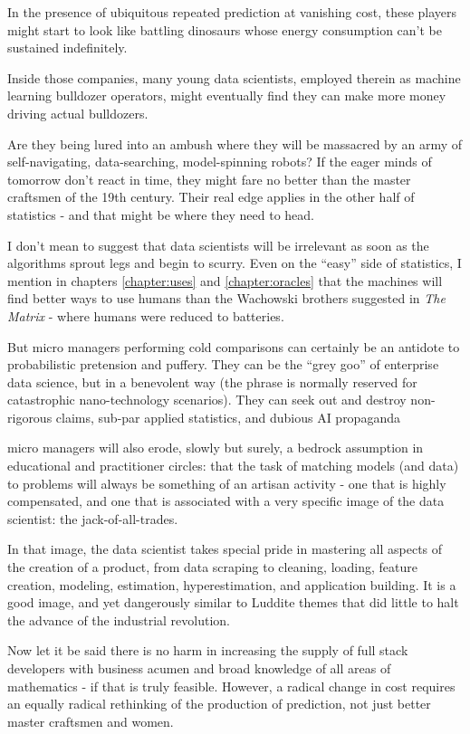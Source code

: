 In the presence of ubiquitous repeated prediction at vanishing cost, these players might start to look like battling dinosaurs whose energy consumption can't be sustained indefinitely.  

Inside those companies, many young data scientists, employed therein as machine learning bulldozer operators, might eventually find they can make more money driving actual bulldozers.   


Are they being lured into an ambush where they will be massacred by an army of self-navigating, data-searching, model-spinning robots? If the eager minds of tomorrow don't react in time, they might fare no better than the master craftsmen of the 19th century. Their real edge applies in the other half of statistics - and that might be where they need to head. 


I don't mean to suggest that data scientists will be irrelevant as soon as the algorithms sprout legs and begin to scurry. Even on the ``easy'' side of statistics, I mention in chapters \ref{chapter:uses} and \ref{chapter:oracles} that the machines will find better ways to use humans than the Wachowski brothers suggested in {\em The Matrix} - where humans were reduced to batteries. 


But micro managers performing cold comparisons can certainly be an antidote to probabilistic pretension and puffery. They can be the ``grey goo'' of enterprise data science, but in a benevolent way  (the phrase is normally reserved for catastrophic nano-technology scenarios). They can seek out and destroy non-rigorous claims, sub-par applied statistics, and dubious AI propaganda


micro managers will also erode, slowly but surely, a bedrock assumption in educational and practitioner circles: that the task of matching models (and data) to problems will always be something of an artisan activity - one that is highly compensated, and one that is associated with a very specific image of the data scientist: the jack-of-all-trades. 


In that image, the data scientist takes special pride in mastering all aspects of the creation of a product, from data scraping to cleaning, loading, feature creation, modeling, estimation, hyperestimation, and application building. It is a good image, and yet dangerously similar to Luddite themes that did little to halt the advance of the industrial revolution. 


Now let it be said there is no harm in increasing the supply of full stack developers with business acumen and broad knowledge of all areas of mathematics - if that is truly feasible. However, a radical change in cost requires an equally radical rethinking of the production of prediction, not just better master craftsmen and women.  


